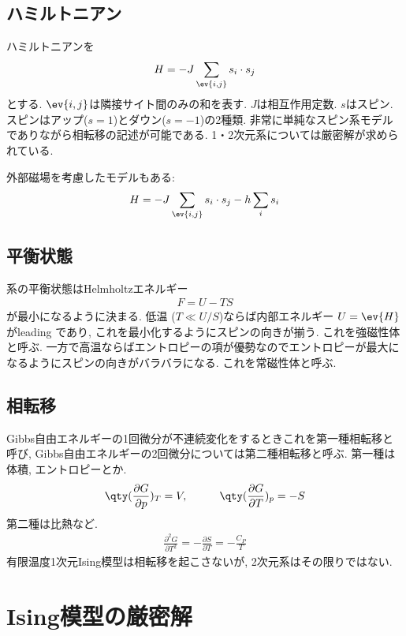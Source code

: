\documentclass[10.5pt,a4paper]{jreport}
\begin{document}
\subsection{ハミルトニアン}
ハミルトニアンを
\begin{eqnarray}
  H = -J\sum_{\ev{i, j}}s_i\cdot s_j
\end{eqnarray}
とする. $\ev{i, j}$は隣接サイト間のみの和を表す. $J$は相互作用定数. $s$はスピン. スピンはアップ($s = 1$)とダウン($s = -1$)の2種類. 非常に単純なスピン系モデルでありながら相転移の記述が可能である. 1・2次元系については厳密解が求められている.

外部磁場を考慮したモデルもある:
\begin{eqnarray}
  H = -J\sum_{\ev{i, j}}s_i\cdot s_j -h\sum_i s_i\label{Ising2}
\end{eqnarray}

\subsection{平衡状態}
系の平衡状態はHelmholtzエネルギー
\begin{eqnarray}
  F = U -TS
\end{eqnarray}
が最小になるように決まる. 低温 ($T \ll U/S$)ならば内部エネルギー $U = \ev{H}$ がleading であり, これを最小化するようにスピンの向きが揃う. これを強磁性体と呼ぶ. 一方で高温ならばエントロピーの項が優勢なのでエントロピーが最大になるようにスピンの向きがバラバラになる. これを常磁性体と呼ぶ.

\subsection{相転移}
Gibbs自由エネルギーの1回微分が不連続変化をするときこれを第一種相転移と呼び, Gibbs自由エネルギーの2回微分については第二種相転移と呼ぶ. 第一種は体積, エントロピーとか. 
\begin{eqnarray}
  \qty(\frac{\partial G}{\partial p})_T = V, \hspace{1cm} \qty(\frac{\partial G}{\partial T})_p = -S
\end{eqnarray}
第二種は比熱など.
\begin{eqnarray}
  \frac{\partial^2 G}{\partial T^2} = -\frac{\partial S}{\partial T} = -\frac{C_P}{T}
\end{eqnarray}
有限温度1次元Ising模型は相転移を起こさないが, 2次元系はその限りではない.

\section{Ising模型の厳密解}
\end{document}
